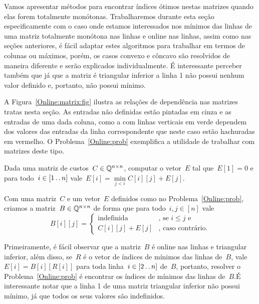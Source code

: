 Vamos apresentar métodos para encontrar índices ótimos nestas matrizes quando elas forem totalmente monótonas. Trabalharemos durante esta seção especificamente com o caso onde estamos interessados nos mínimos das linhas de uma matriz totalmente monótona nas linhas e online nas linhas, assim como nas seções anteriores, é fácil adaptar estes algoritmos para trabalhar em termos de colunas ou máximos, porém, os casos convexo e côncavo são resolvidos de maneira diferente e serão explicados individualmente. É interessante perceber também que já que a matriz é triangular inferior a linha 1 não possui nenhum valor definido e, portanto, não possui mínimo. 

A Figura~\ref{Online:matrix:fig} ilustra as relações de dependência nas matrizes tratas nesta seção. As entradas não definidas estão pintadas em cinza e as entradas de uma dada coluna, como a com linhas verticais em verde dependem dos valores das entradas da linha correspondente que neste caso estão hachuradas em vermelho. O Problema~\ref{Online:prob} exemplifica a utilidade de trabalhar com matrizes deste tipo.

\begin{prob} \label{Online:prob}
Dada uma matriz de custos~$C \in \mathbb{Q}^{n \times n}$, computar o vetor~$E$ tal que~$E[1] = 0$ e para todo~$i \in [1 \,.\,.\, n]$ vale~$E[i] = \min\limits_{j < i} C[i][j] + E[j]$.
\end{prob}

Com uma matriz~$C$ e um vetor~$E$ definidos como no Problema~\ref{Online:prob}, criamos a matriz~$B \in \mathbb{Q}^{n \times n}$ de forma que para todo~$i,j \in [n]$ vale
\begin{equation} \label{Online:Bmat}
    B[i][j] = \begin{cases}
        \text{indefinida} & \text{, se } i \leq j \text{ e } \\
        C[i][j] + E[j]    & \text{, caso contrário.}
    \end{cases}
\end{equation}

Primeiramente, é fácil observar que a matriz~$B$ é online nas linhas e triangular inferior, além disso, se~$R$ é o vetor de índices de mínimos das linhas de~$B$, vale~$E[i] = B[i][R[i]]$ para toda linha~$i \in [2 \,.\,.\, n]$ de~$B$, portanto, resolver o Problema~\ref{Online:prob} é encontrar os índices de mínimos das linhas de~$B$.É interessante notar que a linha 1 de uma matriz triangular inferior não possui mínimo, já que todos os seus valores são indefinidos.


